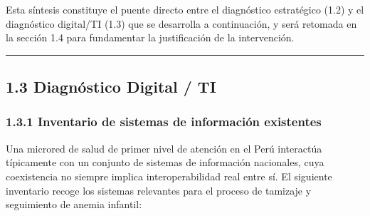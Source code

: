 \documentclass[11pt,a4paper]{article}
\begin{document}
Esta síntesis constituye el puente directo entre el diagnóstico estratégico (1.2) y el diagnóstico digital/TI (1.3) que se desarrolla a continuación, y será retomada en la sección 1.4 para fundamentar la justificación de la intervención.

\begin{center}\rule{0.5\linewidth}{0.5pt}\end{center}

\subsection{1.3 Diagnóstico Digital / TI}\label{diagnuxf3stico-digital-ti}

\subsubsection{1.3.1 Inventario de sistemas de información existentes}\label{inventario-de-sistemas-de-informaciuxf3n-existentes}

Una microred de salud de primer nivel de atención en el Perú interactúa típicamente con un conjunto de sistemas de información nacionales, cuya coexistencia no siempre implica interoperabilidad real entre sí. El siguiente inventario recoge los sistemas relevantes para el proceso de tamizaje y seguimiento de anemia infantil:
\end{document}

